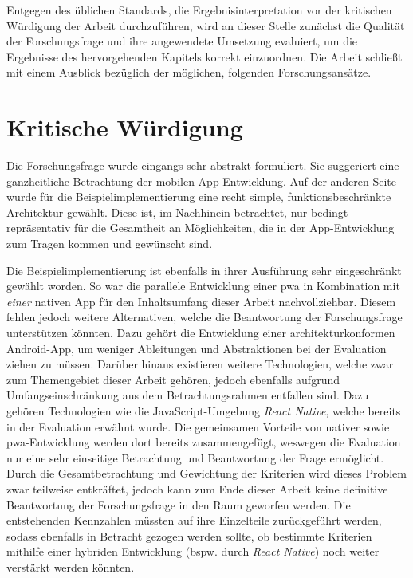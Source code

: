 Entgegen des üblichen Standards, die Ergebnisinterpretation vor der kritischen Würdigung der Arbeit durchzuführen, wird an dieser Stelle zunächst die Qualität der Forschungsfrage und ihre angewendete Umsetzung evaluiert, um die Ergebnisse des hervorgehenden Kapitels korrekt einzuordnen. Die Arbeit schließt mit einem Ausblick bezüglich der möglichen, folgenden Forschungsansätze.

\section{Kritische Würdigung}
Die Forschungsfrage wurde eingangs sehr abstrakt formuliert. Sie suggeriert eine ganzheitliche Betrachtung der mobilen App-Entwicklung. Auf der anderen Seite wurde für die Beispielimplementierung eine recht simple, funktionsbeschränkte Architektur gewählt. Diese ist, im Nachhinein betrachtet, nur bedingt repräsentativ für die Gesamtheit an Möglichkeiten, die in der App-Entwicklung zum Tragen kommen und gewünscht sind.

Die Beispielimplementierung ist ebenfalls in ihrer Ausführung sehr eingeschränkt gewählt worden. So war die parallele Entwicklung einer \ac{pwa} in Kombination mit \textit{einer} nativen App für den Inhaltsumfang dieser Arbeit nachvollziehbar. Diesem fehlen jedoch weitere Alternativen, welche die Beantwortung der Forschungsfrage unterstützen könnten. Dazu gehört die Entwicklung einer architekturkonformen Android-App, um weniger Ableitungen und Abstraktionen bei der Evaluation ziehen zu müssen. Darüber hinaus existieren weitere Technologien, welche zwar zum Themengebiet dieser Arbeit gehören, jedoch ebenfalls aufgrund Umfangseinschränkung aus dem Betrachtungsrahmen entfallen sind. Dazu gehören Technologien wie die JavaScript-Umgebung \textit{React Native}, welche bereits in der Evaluation erwähnt wurde. Die gemeinsamen Vorteile von nativer sowie \ac{pwa}-Entwicklung werden dort bereits zusammengefügt, weswegen die Evaluation nur eine sehr einseitige Betrachtung und Beantwortung der Frage ermöglicht. Durch die Gesamtbetrachtung und Gewichtung der Kriterien wird dieses Problem zwar teilweise entkräftet, jedoch kann zum Ende dieser Arbeit keine definitive Beantwortung der Forschungsfrage in den Raum geworfen werden. Die entstehenden Kennzahlen müssten auf ihre Einzelteile zurückgeführt werden, sodass ebenfalls in Betracht gezogen werden sollte, ob bestimmte Kriterien mithilfe einer hybriden Entwicklung (bspw. durch \textit{React Native}) noch weiter verstärkt werden könnten.

